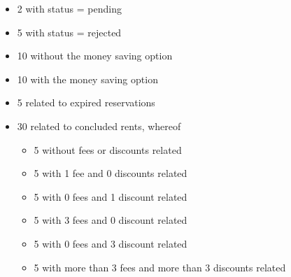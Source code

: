 \begin{itemize}
	\begin{itemize}
		\item 2 with status = pending
		\item 5 with status = rejected
		\item 10 without the money saving option
		\item 10 with the money saving option
		\item 5 related to expired reservations
		\item 30 related to concluded rents, whereof
		\begin{itemize}
			\item 5 without fees or discounts related
			\item 5 with 1 fee and 0 discounts related
			\item 5 with 0 fees and 1 discount related
			\item 5 with 3 fees and 0 discount related
			\item 5 with 0 fees and 3 discount related
			\item 5 with more than 3 fees and more than 3 discounts related
		\end{itemize}
	\end{itemize}
\end{itemize}